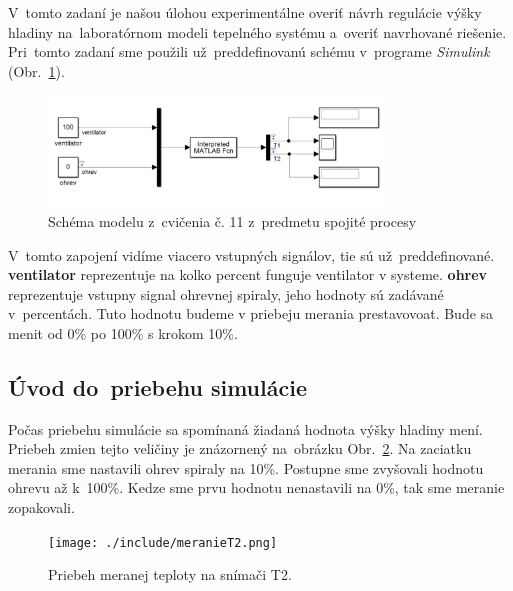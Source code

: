 \documentclass{article}
\begin{document}
V~tomto zadaní je našou úlohou experimentálne overiť návrh regulácie výšky hladiny na~laboratórnom
modeli tepelného systému a~overiť navrhované riešenie. Pri~tomto zadaní sme použili už~preddefinovanú schému
v~programe \textit{Simulink} (Obr.~\ref{fig:schema}).

\begin{figure}[!htbp]
	\begin{center}
		\includegraphics[width=0.8\textwidth]{./include/schema.png}
	\end{center}
	\caption{Schéma modelu z~cvičenia č. 11 z~predmetu spojité procesy}
	\label{fig:schema}
\end{figure}

V~tomto zapojení vidíme viacero vstupných signálov, tie sú už~preddefinované. \textbf{ventilator} reprezentuje na kolko percent funguje ventilator v systeme. \textbf{ohrev} reprezentuje vstupny signal ohrevnej spiraly, jeho hodnoty
sú zadávané v~percentách. Tuto hodnotu budeme v priebeju merania prestavovoat. Bude sa menit od 0\% po 100\% s krokom 10\%.

\clearpage

\subsection{Úvod do~priebehu simulácie}
\label{subsec:priebehSimulacie}

Počas priebehu simulácie sa spomínaná žiadaná hodnota výšky hladiny mení. Priebeh zmien tejto veličiny je znázornený na~obrázku Obr.~\ref{fig:mt2}.
Na zaciatku merania sme nastavili ohrev spiraly na 10\%. Postupne sme zvyšovali hodnotu ohrevu až k~100\%.
Kedze sme prvu hodnotu nenastavili na 0\%, tak sme meranie zopakovali.

\begin{figure}[!htbp]
	\begin{center}
		\texttt{[image: ./include/meranieT2.png]}
		\caption{Priebeh meranej teploty na snímači T2.}
		\label{fig:mt2}
	\end{center}
	\hfill
\end{figure}

\newpage
\end{document}
